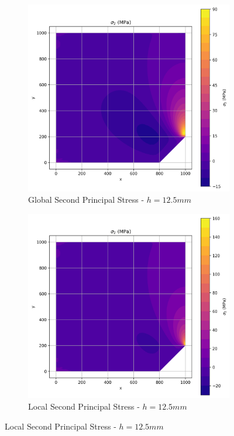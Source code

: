 \begin{figure}[H]
  \centering
  \begin{subfigure}[b]{0.45\textwidth}
    \centering
    \includegraphics[width=\textwidth]{GRAFICOS/Quad9/1.5mm_global/resultados - sigma_2.png}
    \caption{Global Second Principal Stress - $h=12.5mm$}
    \label{fig:img12}
  \end{subfigure}
  \hfill
  \begin{subfigure}[b]{0.45\textwidth}
    \centering
    \includegraphics[width=\textwidth]{GRAFICOS/Quad9/1.5mm_local/resultados - sigma_2.png}
    \caption{Local Second Principal Stress - $h=12.5mm$}
    \label{fig:img22}
  \end{subfigure}
\end{figure}

